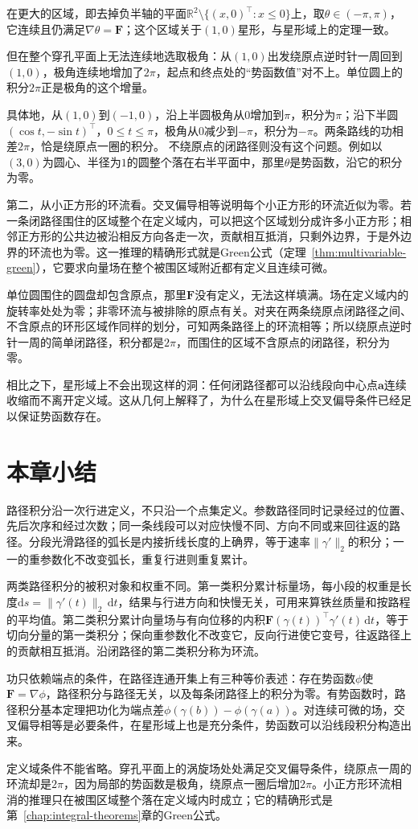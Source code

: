 在更大的区域，即去掉负半轴的平面$\mathbb R^2\setminus\{(x,0)^\top:x\leq0\}$上，取$\theta\in(-\pi,\pi)$，它连续且仍满足$\nabla\theta=\bm F$；这个区域关于$(1,0)$星形，与星形域上的定理一致。

但在整个穿孔平面上无法连续地选取极角：从$(1,0)$出发绕原点逆时针一周回到$(1,0)$，极角连续地增加了$2\pi$，起点和终点处的“势函数值”对不上。单位圆上的积分$2\pi$正是极角的这个增量。

具体地，从$(1,0)$到$(-1,0)$，沿上半圆极角从$0$增加到$\pi$，积分为$\pi$；沿下半圆$(\cos t,-\sin t)^\top$，$0\leq t\leq\pi$，极角从$0$减少到$-\pi$，积分为$-\pi$。两条路线的功相差$2\pi$，恰是绕原点一圈的积分。
不绕原点的闭路径则没有这个问题。例如以$(3,0)$为圆心、半径为$1$的圆整个落在右半平面中，那里$\theta$是势函数，沿它的积分为零。

第二，从小正方形的环流看。交叉偏导相等说明每个小正方形的环流近似为零。若一条闭路径围住的区域整个在定义域内，可以把这个区域划分成许多小正方形；相邻正方形的公共边被沿相反方向各走一次，贡献相互抵消，只剩外边界，于是外边界的环流也为零。这一推理的精确形式就是Green公式（定理~\ref{thm:multivariable-green}），它要求向量场在整个被围区域附近都有定义且连续可微。

单位圆围住的圆盘却包含原点，那里$\bm F$没有定义，无法这样填满。场在定义域内的旋转率处处为零；非零环流与被排除的原点有关。对夹在两条绕原点闭路径之间、不含原点的环形区域作同样的划分，可知两条路径上的环流相等；所以绕原点逆时针一周的简单闭路径，积分都是$2\pi$，而围住的区域不含原点的闭路径，积分为零。

相比之下，星形域上不会出现这样的洞：任何闭路径都可以沿线段向中心点$\bm a$连续收缩而不离开定义域。这从几何上解释了，为什么在星形域上交叉偏导条件已经足以保证势函数存在。

\FloatBarrier
\section{本章小结}
\label{sec:path-integrals-chapter-summary}

路径积分沿一次行进定义，不只沿一个点集定义。参数路径同时记录经过的位置、先后次序和经过次数；同一条线段可以对应快慢不同、方向不同或来回往返的路径。分段光滑路径的弧长是内接折线长度的上确界，等于速率$\lVert\gamma'\rVert_2$的积分；一一的重参数化不改变弧长，重复行进则重复累计。

两类路径积分的被积对象和权重不同。第一类积分累计标量场，每小段的权重是长度$\mathrm ds=\lVert\gamma'(t)\rVert_2\,\mathrm dt$，结果与行进方向和快慢无关，可用来算铁丝质量和按路程的平均值。第二类积分累计向量场与有向位移的内积$\bm F(\gamma(t))^\top\gamma'(t)\,\mathrm dt$，等于切向分量的第一类积分；保向重参数化不改变它，反向行进使它变号，往返路径上的贡献相互抵消。沿闭路径的第二类积分称为环流。

功只依赖端点的条件，在路径连通开集上有三种等价表述：存在势函数$\phi$使$\bm F=\nabla\phi$，路径积分与路径无关，以及每条闭路径上的积分为零。有势函数时，路径积分基本定理把功化为端点差$\phi(\gamma(b))-\phi(\gamma(a))$。对连续可微的场，交叉偏导相等是必要条件，在星形域上也是充分条件，势函数可以沿线段积分构造出来。

定义域条件不能省略。穿孔平面上的涡旋场处处满足交叉偏导条件，绕原点一周的环流却是$2\pi$，因为局部的势函数是极角，绕原点一圈后增加$2\pi$。小正方形环流相消的推理只在被围区域整个落在定义域内时成立；它的精确形式是第~\ref{chap:integral-theorems}章的Green公式。
